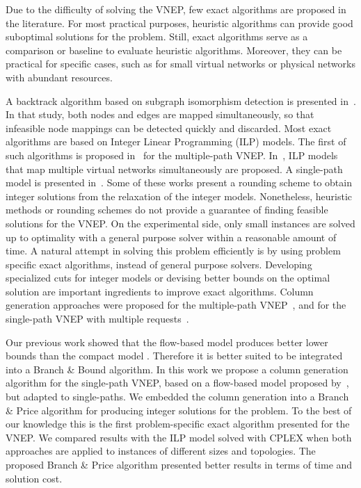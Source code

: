 \documentclass[conference]{IEEEtran}
\begin{document}
Due to the difficulty of solving the VNEP, few exact algorithms are proposed in the literature.
For most practical purposes, heuristic algorithms can provide good suboptimal solutions for the problem.
Still, exact algorithms serve as a comparison or baseline to evaluate heuristic algorithms.
Moreover, they can be practical for specific cases, such as for small virtual networks or physical networks with abundant resources.

A backtrack algorithm based on subgraph isomorphism detection is presented in~\cite{Lischka:2009}. In that study, both nodes and edges are mapped simultaneously, so that infeasible node mappings can be detected quickly and discarded.
Most exact algorithms are based on Integer Linear Programming (ILP) models. 
The first of such algorithms is proposed in~\cite{Chowdhury:2012} for the multiple-path VNEP.
In~\cite{Houidi:2011,Guerzoni:2014}, ILP models that map multiple virtual networks simultaneously are proposed.
A single-path model is presented in~\cite{Alkmim2013}.
Some of these works present a rounding scheme to obtain integer solutions from the relaxation of the integer models. Nonetheless, heuristic methods or rounding schemes do not provide a guarantee of finding feasible solutions for the VNEP. 
On the experimental side, only small instances are solved up to optimality with a general purpose solver within a reasonable amount of time.
A natural attempt in solving this problem efficiently is by using problem specific exact algorithms, instead of general purpose solvers.
Developing specialized cuts for integer models or devising better bounds on the optimal solution are important ingredients to improve exact algorithms. 
Column generation approaches were proposed for the multiple-path VNEP~\cite{hu:2013}, and for the single-path VNEP with multiple requests~\cite{Jarray2012}.

Our previous work showed that the flow-based model produces better lower bounds than the compact model \cite{Moura:2014}.
Therefore it is better suited to be integrated into a Branch \& Bound algorithm.
In this work we propose a column generation algorithm for the single-path VNEP, based on a flow-based model proposed by~\cite{hu:2013}, but adapted to single-paths.
We embedded the column generation into a Branch \& Price algorithm for producing integer solutions for the problem.
To the best of our knowledge this is the first problem-specific exact algorithm presented for the VNEP.
We compared results with the ILP model solved with CPLEX when both approaches are applied to instances of different sizes and topologies.
The proposed Branch \& Price algorithm presented better results in terms of time and solution cost.
\end{document}
